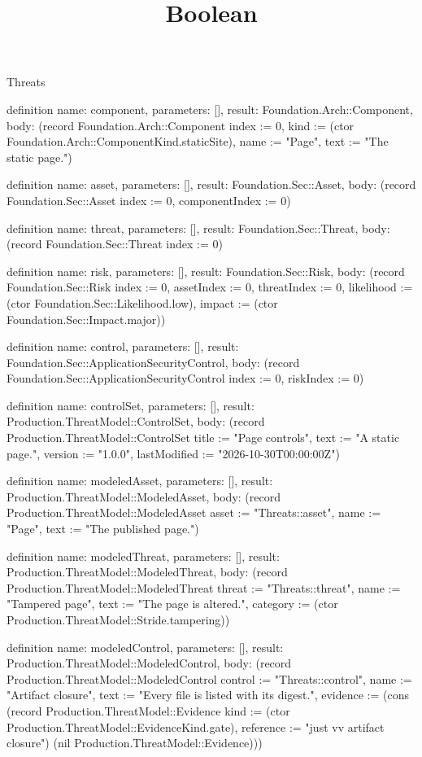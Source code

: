 \begin{lexlean}{Threats}
\title{Boolean}
\begin{semanticmodule}
definition{
  name: component,
  parameters: [],
  result: Foundation.Arch::Component,
  body: (record Foundation.Arch::Component {index := 0, kind := (ctor Foundation.Arch::ComponentKind.staticSite), name := "Page", text := "The static page."})
}

definition{
  name: asset,
  parameters: [],
  result: Foundation.Sec::Asset,
  body: (record Foundation.Sec::Asset {index := 0, componentIndex := 0})
}

definition{
  name: threat,
  parameters: [],
  result: Foundation.Sec::Threat,
  body: (record Foundation.Sec::Threat {index := 0})
}

definition{
  name: risk,
  parameters: [],
  result: Foundation.Sec::Risk,
  body: (record Foundation.Sec::Risk {index := 0, assetIndex := 0, threatIndex := 0, likelihood := (ctor Foundation.Sec::Likelihood.low), impact := (ctor Foundation.Sec::Impact.major)})
}

definition{
  name: control,
  parameters: [],
  result: Foundation.Sec::ApplicationSecurityControl,
  body: (record Foundation.Sec::ApplicationSecurityControl {index := 0, riskIndex := 0})
}

definition{
  name: controlSet,
  parameters: [],
  result: Production.ThreatModel::ControlSet,
  body: (record Production.ThreatModel::ControlSet {title := "Page controls", text := "A static page.", version := "1.0.0", lastModified := "2026-10-30T00:00:00Z"})
}

definition{
  name: modeledAsset,
  parameters: [],
  result: Production.ThreatModel::ModeledAsset,
  body: (record Production.ThreatModel::ModeledAsset {asset := "Threats::asset", name := "Page", text := "The published page."})
}

definition{
  name: modeledThreat,
  parameters: [],
  result: Production.ThreatModel::ModeledThreat,
  body: (record Production.ThreatModel::ModeledThreat {threat := "Threats::threat", name := "Tampered page", text := "The page is altered.", category := (ctor Production.ThreatModel::Stride.tampering)})
}

definition{
  name: modeledControl,
  parameters: [],
  result: Production.ThreatModel::ModeledControl,
  body: (record Production.ThreatModel::ModeledControl {control := "Threats::control", name := "Artifact closure", text := "Every file is listed with its digest.", evidence := (cons (record Production.ThreatModel::Evidence {kind := (ctor Production.ThreatModel::EvidenceKind.gate), reference := "just vv artifact closure"}) (nil Production.ThreatModel::Evidence))})
}
\end{semanticmodule}
\end{lexlean}
